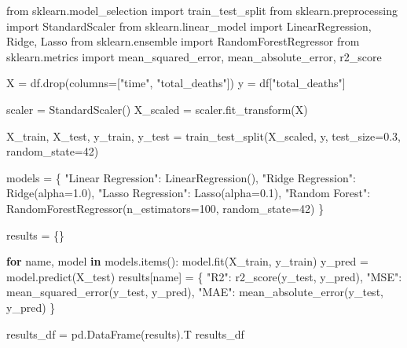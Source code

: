 \documentclass[
  letterpaper,
  DIV=11,
  numbers=noendperiod]{scrartcl}
\newenvironment{Shaded}{\begin{snugshade}}{\end{snugshade}}
\newcommand{\ControlFlowTok}[1]{\textcolor[rgb]{0.00,0.23,0.31}{\textbf{#1}}}
\newcommand{\DecValTok}[1]{\textcolor[rgb]{0.68,0.00,0.00}{#1}}
\newcommand{\FloatTok}[1]{\textcolor[rgb]{0.68,0.00,0.00}{#1}}
\newcommand{\ImportTok}[1]{\textcolor[rgb]{0.00,0.46,0.62}{#1}}
\newcommand{\KeywordTok}[1]{\textcolor[rgb]{0.00,0.23,0.31}{\textbf{#1}}}
\newcommand{\NormalTok}[1]{\textcolor[rgb]{0.00,0.23,0.31}{#1}}
\newcommand{\OperatorTok}[1]{\textcolor[rgb]{0.37,0.37,0.37}{#1}}
\newcommand{\StringTok}[1]{\textcolor[rgb]{0.13,0.47,0.30}{#1}}
\begin{document}
\begin{Shaded}
\begin{Highlighting}[]
\ImportTok{from}\NormalTok{ sklearn.model\_selection }\ImportTok{import}\NormalTok{ train\_test\_split}
\ImportTok{from}\NormalTok{ sklearn.preprocessing }\ImportTok{import}\NormalTok{ StandardScaler}
\ImportTok{from}\NormalTok{ sklearn.linear\_model }\ImportTok{import}\NormalTok{ LinearRegression, Ridge, Lasso}
\ImportTok{from}\NormalTok{ sklearn.ensemble }\ImportTok{import}\NormalTok{ RandomForestRegressor}
\ImportTok{from}\NormalTok{ sklearn.metrics }\ImportTok{import}\NormalTok{ mean\_squared\_error, mean\_absolute\_error, r2\_score}

\NormalTok{X }\OperatorTok{=}\NormalTok{ df.drop(columns}\OperatorTok{=}\NormalTok{[}\StringTok{"time"}\NormalTok{, }\StringTok{"total\_deaths"}\NormalTok{])  }
\NormalTok{y }\OperatorTok{=}\NormalTok{ df[}\StringTok{"total\_deaths"}\NormalTok{]}

\NormalTok{scaler }\OperatorTok{=}\NormalTok{ StandardScaler()}
\NormalTok{X\_scaled }\OperatorTok{=}\NormalTok{ scaler.fit\_transform(X)}

\NormalTok{X\_train, X\_test, y\_train, y\_test }\OperatorTok{=}\NormalTok{ train\_test\_split(X\_scaled, y, test\_size}\OperatorTok{=}\FloatTok{0.3}\NormalTok{, random\_state}\OperatorTok{=}\DecValTok{42}\NormalTok{)}

\NormalTok{models }\OperatorTok{=}\NormalTok{ \{}
    \StringTok{"Linear Regression"}\NormalTok{: LinearRegression(),}
    \StringTok{"Ridge Regression"}\NormalTok{: Ridge(alpha}\OperatorTok{=}\FloatTok{1.0}\NormalTok{),}
    \StringTok{"Lasso Regression"}\NormalTok{: Lasso(alpha}\OperatorTok{=}\FloatTok{0.1}\NormalTok{),}
    \StringTok{"Random Forest"}\NormalTok{: RandomForestRegressor(n\_estimators}\OperatorTok{=}\DecValTok{100}\NormalTok{, random\_state}\OperatorTok{=}\DecValTok{42}\NormalTok{)}
\NormalTok{\}}

\NormalTok{results }\OperatorTok{=}\NormalTok{ \{\}}

\ControlFlowTok{for}\NormalTok{ name, model }\KeywordTok{in}\NormalTok{ models.items():}
\NormalTok{    model.fit(X\_train, y\_train)}
\NormalTok{    y\_pred }\OperatorTok{=}\NormalTok{ model.predict(X\_test)}
\NormalTok{    results[name] }\OperatorTok{=}\NormalTok{ \{}
        \StringTok{"R2"}\NormalTok{: r2\_score(y\_test, y\_pred),}
        \StringTok{"MSE"}\NormalTok{: mean\_squared\_error(y\_test, y\_pred),}
        \StringTok{"MAE"}\NormalTok{: mean\_absolute\_error(y\_test, y\_pred)}
\NormalTok{    \}}

\NormalTok{results\_df }\OperatorTok{=}\NormalTok{ pd.DataFrame(results).T}
\NormalTok{results\_df}
\end{Highlighting}
\end{Shaded}
\end{document}
